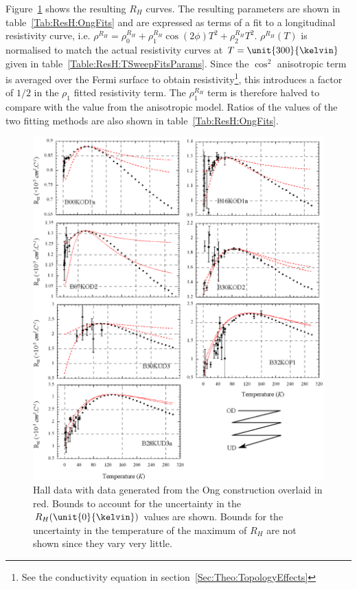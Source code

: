 Figure~\ref{Fig:ResH:OngFits} shows the resulting $R_H$ curves. The resulting parameters are shown in table~\ref{Tab:ResH:OngFits} and are expressed as terms of a fit to a longitudinal resistivity curve, i.e. $\rho^{R_H} = \rho_0^{R_H} + \rho_1^{R_H}\cos(2\phi)T^2 + \rho_2^{R_H} T^2$. $\rho^{R_H}(T)$ is normalised to match the actual resistivity curves at $T=\unit{300}{\kelvin}$ given in table~\ref{Table:ResH:TSweepFitsParams}. Since the $\cos^2$ anisotropic term is averaged over the Fermi surface to obtain resistivity\footnote{See the conductivity equation in section~\ref{Sec:Theo:TopologyEffects}}, this introduces a factor of $1/2$ in the $\rho_1$ fitted resistivity term. The $\rho^{R_H}_1$ term is therefore halved to compare with the value from the anisotropic model. Ratios of the values of the two fitting methods are also shown in table~\ref{Tab:ResH:OngFits}.
\begin{figure}[htbp]
    \begin{center}
        \includegraphics[scale=0.9]{Chapter-HallBSCO/Figures/OngFits/OngFits}
        \caption{Hall data with data generated from the Ong construction overlaid in red. Bounds to account for the uncertainty in the $R_H(\unit{0}{\kelvin})$ values are shown. Bounds for the uncertainty in the temperature of the maximum of $R_H$ are not shown since they vary very little.}
        \label{Fig:ResH:OngFits}
    \end{center}
\end{figure}

